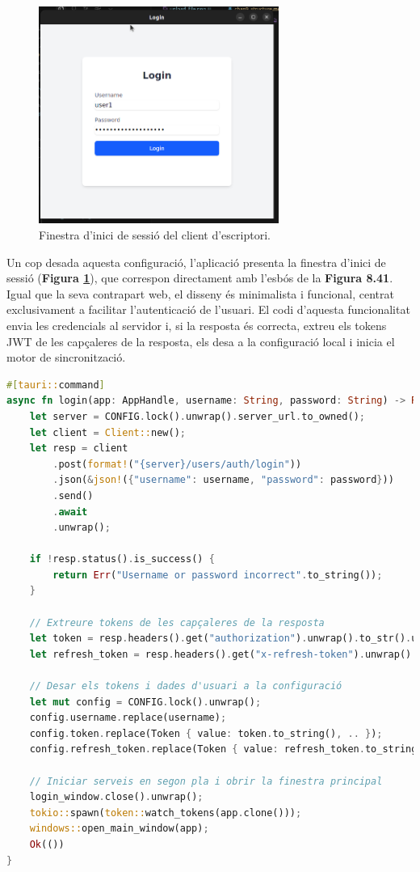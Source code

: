 \begin{figure}[H]
  \centering
  \includegraphics[width=0.7\textwidth]{Figures/ui-desktop/login.png}
  \caption{Finestra d'inici de sessió del client d'escriptori.}
  \label{fig:desktop-login-impl}
\end{figure}

Un cop desada aquesta configuració, l'aplicació presenta la finestra d'inici de sessió (\textbf{Figura \ref{fig:desktop-login-impl}}), que correspon directament amb l'esbós de la \textbf{Figura 8.41}. Igual que la seva contrapart web, el disseny és minimalista i funcional, centrat exclusivament a facilitar l'autenticació de l'usuari. El codi d'aquesta funcionalitat envia les credencials al servidor i, si la resposta és correcta, extreu els tokens JWT de les capçaleres de la resposta, els desa a la configuració local i inicia el motor de sincronització.

\begin{lstlisting}[language=rust, caption={Comandament per a l'inici de sessió a \texttt{main.rs}}]
#[tauri::command]
async fn login(app: AppHandle, username: String, password: String) -> Result<(), String> {
    let server = CONFIG.lock().unwrap().server_url.to_owned();
    let client = Client::new();
    let resp = client
        .post(format!("{server}/users/auth/login"))
        .json(&json!({"username": username, "password": password}))
        .send()
        .await
        .unwrap();

    if !resp.status().is_success() {
        return Err("Username or password incorrect".to_string());
    }

    // Extreure tokens de les capçaleres de la resposta
    let token = resp.headers().get("authorization").unwrap().to_str().unwrap();
    let refresh_token = resp.headers().get("x-refresh-token").unwrap().to_str().unwrap();

    // Desar els tokens i dades d'usuari a la configuració
    let mut config = CONFIG.lock().unwrap();
    config.username.replace(username);
    config.token.replace(Token { value: token.to_string(), .. });
    config.refresh_token.replace(Token { value: refresh_token.to_string(), .. });
    
    // Iniciar serveis en segon pla i obrir la finestra principal
    login_window.close().unwrap();
    tokio::spawn(token::watch_tokens(app.clone()));
    windows::open_main_window(app);
    Ok(())
}
\end{lstlisting}


